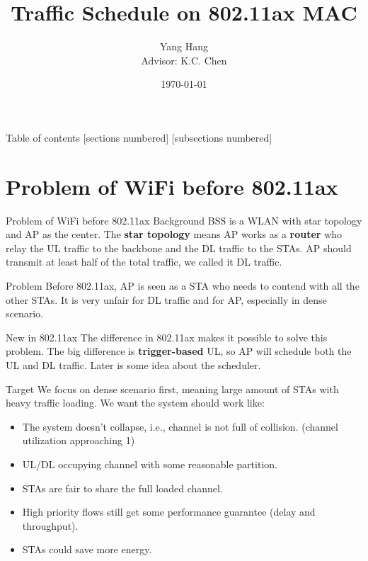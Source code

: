 \documentclass[10pt]{beamer}
\title{Traffic Schedule on 802.11ax MAC}
\date{\today}
\author{Yang Hang \\ Advisor: K.C. Chen}
\institute{Gratitude Institute of Communication Engineering }
\begin{document}
\maketitle
\begin{frame}{Table of contents}
	[sections numbered]
    [subsections numbered]
\setcounter{tocdepth}{5}
\setcounter{secnumdepth}{5} 
    \tableofcontents%
\end{frame}

\section{Problem of WiFi before 802.11ax}
\begin{frame}{Problem of WiFi before 802.11ax}
\alert{Background}
BSS is a WLAN with star topology and AP as the center. 
The \textbf{star topology} means AP works as a \textbf{router} who relay the UL traffic to the backbone and the DL traffic to the STAs. 
AP should transmit at least half of the total traffic, we called it DL traffic. 

\alert{Problem} 
Before 802.11ax, AP is seen as a STA who needs to contend with all the other STAs. It is very unfair for DL traffic and for AP, especially in dense scenario. 

\alert{New in 802.11ax}
The difference in 802.11ax makes it possible to solve this problem. 
The big difference is \textbf{trigger-based} UL, so AP will schedule both the UL and DL traffic. 
Later is some idea about the scheduler.  
\end{frame}

\begin{frame}{Target}
We focus on dense scenario first, meaning large amount of STAs with heavy traffic loading. 
We want the system should work like:
\begin{itemize}
	\item The system doesn't collapse, i.e., channel is not full of collision. (channel utilization approaching 1)
 	\item UL/DL occupying channel with some reasonable partition.
	\item STAs are fair to share the full loaded channel. 
	\item High priority flows still get some performance guarantee (delay and throughput). 
	\item STAs could save more energy.
\end{itemize} 
\end{frame}
\end{document}
